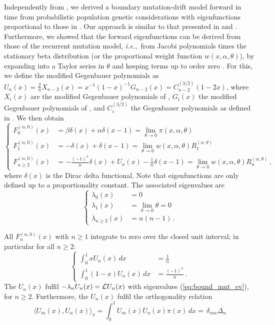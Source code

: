 \documentclass[preprint]{elsarticle}
\newcommand\ie{{\it i.e.,}}
\begin{document}
Independently from \citet{Tran14b}, we derived a boundary mutation-drift model forward in time from probabilistic population genetic considerations \citep{Vogl15} with eigenfunctions proportional to those in \citet{Tran14b}. Our approach is similar to that presented in \citet{McKa07} and \citet{Waxm11}. Furthermore, we showed that the forward eigenfunctions can be derived from those of the recurrent mutation model, \ie\ from Jacobi polynomials times the stationary beta distribution (or the proportional weight function $w(x,\alpha,\theta)$), by expanding into a Taylor series in $\theta$ and keeping terms up to order zero \citep[][Appendix A.1]{Vogl16}. For this, we define the modified Gegenbauer polynomials as  $U_n(x)=\frac{2}{n}X_{n-2}(x)=x^{-1}(1-x)^{-1}G_{n-2}(x)=C_{n-2}^{(3/2)}(1-2x)$, where $X_i(x)$ are the modified Gegenbauer polynomials of \citet{Tran14b}, $G_i(x)$ the modified Gegenbauer polynomials of \citet{Song12}, and $C_{i}^{(3/2)}$ the Gegenbauer polynomials as defined in \citet{Abra70}. We then obtain
\begin{equation}\label{eq:forw_Us}
\begin{cases}
    F_0^{(\alpha,0)}(x)&=\beta\delta(x)+\alpha\delta(x-1)=\lim_{\theta\to0}\pi(x,\alpha,\theta)\\
    F_1^{(\alpha,0)}(x)&=-\delta(x)+\delta(x-1)=\lim_{\theta\to0}w(x,\alpha,\theta)R_1^{(\alpha,\theta)}\\
    F_{n\geq2}^{(\alpha,0)}(x)&=-\frac{(-1)^n}n\delta(x)+U_n(x)-\frac{1}n\delta(x-1)=\lim_{\theta\to0}w(x,\alpha,\theta)R_n^{(\alpha,\theta)}\,,
\end{cases}
\end{equation}
where $\delta(x)$ is the Dirac delta functional. Note that eigenfunctions are only defined up to a proportionality constant. The associated eigenvalues are 
\begin{equation}\label{eq:bound_mut_ev}
\begin{cases}
    \lambda_0(x)&=0\\
    \lambda_1(x)&=\lim_{\theta\to0}\theta=0\\
    \lambda_{n\geq2}(x)&=n(n-1)\,.
\end{cases}
\end{equation}

All $F_n^{(\alpha,0)}(x)$ with $n\geq 1$ integrate to zero over the closed unit interval; in particular for all $n\geq2$:
\begin{equation}\label{eq:int_U_n}
\begin{cases}
    \int_0^1 xU_n(x)\,dx&= \frac{1}n\\
    \int_0^1 (1-x)U_n(x)\,dx&= \frac{(-1)^n}n\,.
\end{cases} 
\end{equation}
The $U_n(x)$ fulfil $-\lambda_n U_n(x)={\cal L}U_n(x)$ with eigenvalues (\ref{eq:bound_mut_ev}), for $n\geq 2$. Furthermore, the $U_n(x)$ fulfil the orthogonality relation
\begin{equation}
    \langle U_m(x), U_n(x) \rangle_{\pi}=\int_0^1 U_m(x) U_n(x) \pi(x)\,dx=\, \delta_{mn} \Delta_n
\end{equation} 
\end{document}
